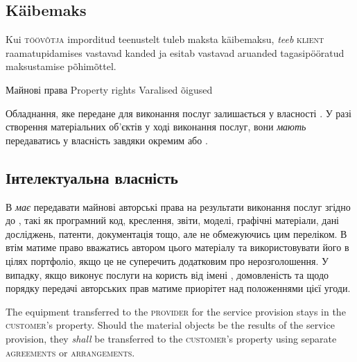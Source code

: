 \begin{Form}
\begin{paracol}{3}
{        \subsection{Käibemaks}
        Kui \textsc{töövõtja} imporditud teenustelt tuleb maksta käibemaksu, \emph{teeb} \textsc{klient} raamatupidamises vastavad kanded ja esitab vastavad aruanded tagasipööratud maksustamise põhimõttel.
        }
      \clause
        {Майнові права}
        {Property rights}
        {Varalised õigused}
        {
        Обладнання, яке передане  для виконання послуг залишається у власності . У разі створення матеріальних об'єктів у ході виконання послуг, вони \textit{мають} передаватись у власність  завдяки окремим  або .

        \subsection{Інтелектуальна власність}
        В \textit{має} передавати  майнові авторські права на результати виконання послуг згідно до , такі як програмний код, креслення, звіти, моделі, графічні матеріали, дані досліджень, патенти, документація тощо, але не обмежуючись цим переліком. В втім матиме право вважатись автором цього матеріалу та використовувати його в цілях портфоліо, якщо це не суперечить додатковим  про нерозголошення. У випадку, якщо  виконує послуги на користь  від імені , домовленість  та  щодо порядку передачі авторських прав матиме приорітет над положеннями цієї угоди.}
        {
        The equipment transferred to the \textsc{provider} for the service provision stays in the \textsc{customer}'s property. Should the material objects be the results of the service provision, they \textit{shall} be transferred to the \textsc{customer}'s property using separate \textsc{agreements} or \textsc{arrangements}.

}
\end{paracol}
\end{Form}
